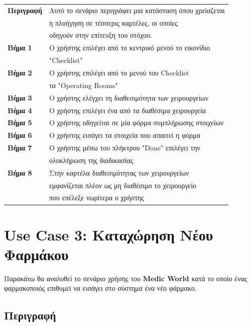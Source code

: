 \documentclass{article}
\newcommand\T{\rule{0pt}{2.6ex}}       %
\newcommand\B{\rule[-1.2ex]{0pt}{0pt}}
\begin{document}
 \begin{center}
     \begin{tabular}{|l|l|}
     \hline
      \textbf{Περιγραφή} & Αυτό το σενάριο περιγράφει μια κατάσταση όπου χρείαζεται \T \\& η πλοήγηση σε τέσσερις καρτέλες, οι οποίες\\& οδηγούν στην επίτευξη του στόχου. \B \\ 
      \hline
      \textbf{Βήμα 1} & Ο χρήστης επιλέγει από το κεντρικό μενού το εικονίδιο \T \\& "Checklist" \B \\
      \hline
      \textbf{Βήμα 2} & Ο χρήστης επιλέγει από το μενού του Checklist \T \\& τα "Operating Rooms" \B \\
      \hline
      \textbf{Βήμα 3} & Ο χρήστης ελέγχει τη διαθεσιμότητα των χειρουργείων \T\B \\
      \hline
      \textbf{Βήμα 4} & Ο χρήστης επιλέγει ένα από τα διαθέσιμα χειρουργεία \T\B \\
      \hline
      \textbf{Βήμα 5} & Ο χρήστης οδηγείται σε μία φόρμα συμπλήρωσης στοιχείων \T\B \\
      \hline
      \textbf{Βήμα 6} & Ο χρήστης εισάγει τα στοιχεία που απαιτεί η φόρμα\T\B \\
      \hline
      \textbf{Βήμα 7} & Ο χρήστης μέσω του πλήκτρου "Done" επιλέγει την \T \\& ολοκλήρωση της διαδικασίας \B \\
      \hline
      \textbf{Βήμα 8} & Στην καρτέλα διαθεσιμότητας των χειρουργείων \T \\& εμφανίζεται πλέον ως μη διαθέσιμο το χειρουργείο\\& που επέλεξε νωρίτερα ο χρήστης \B \\
      \hline
     \end{tabular}
 \end{center}
 

  \section{Use Case 3: Καταχώρηση Νέου Φαρμάκου }
 
 Παρακάτω θα αναλυθεί το σενάριο χρήσης του \textbf{Medic World} κατά το οποίο ένας φαρμακοποιός επιθυμεί να εισάγει στο σύστημα ένα νέο φάρμακο.
 
\subsection{Περιγραφή}
\end{document}
